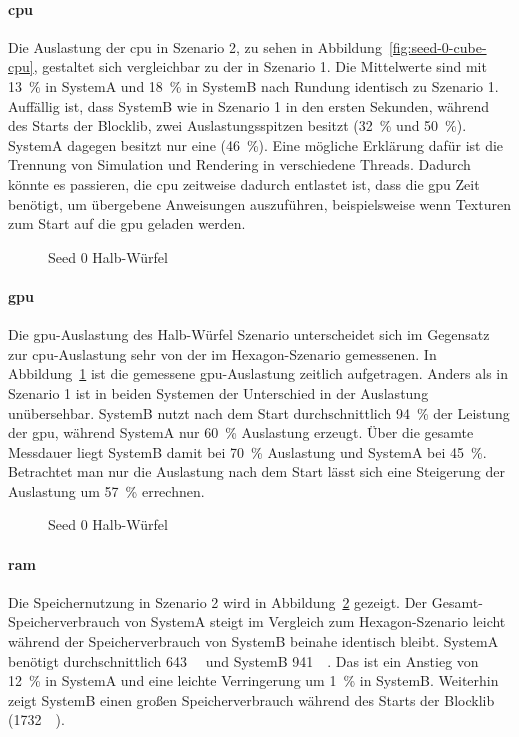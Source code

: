 \paragraph{\ac{cpu}} Die Auslastung der \ac{cpu} in Szenario 2, zu sehen in Abbildung~\ref{fig:seed-0-cube-cpu}, gestaltet sich vergleichbar zu der in Szenario 1. Die Mittelwerte sind mit \SI{13}{\percent} in SystemA und \SI{18}{\percent} in SystemB nach Rundung identisch zu Szenario 1.
Auffällig ist, dass SystemB wie in Szenario 1 in den ersten Sekunden, während des Starts der Blocklib, zwei Auslastungsspitzen besitzt (\SI{32}{\percent} und \SI{50}{\percent}). SystemA dagegen besitzt nur eine (\SI{46}{\percent}). Eine mögliche Erklärung dafür ist die Trennung von Simulation und Rendering in verschiedene Threads. Dadurch könnte es passieren, die \ac{cpu} zeitweise dadurch entlastet ist, dass die \ac{gpu} Zeit benötigt, um übergebene Anweisungen auszuführen, beispielsweise wenn Texturen zum Start auf die \ac{gpu} geladen werden.

\begin{figure}[!htb]
	\caption{Seed 0 Halb-Würfel}\label{fig:seed-0-cube-gpu}
\end{figure}
\paragraph{\ac{gpu}} Die \ac{gpu}-Auslastung des Halb-Würfel Szenario unterscheidet sich im Gegensatz zur \ac{cpu}-Auslastung sehr von der im Hexagon-Szenario gemessenen. In Abbildung~\ref{fig:seed-0-cube-gpu} ist die gemessene \ac{gpu}-Auslastung zeitlich aufgetragen. Anders als in Szenario 1 ist in beiden Systemen der Unterschied in der Auslastung unübersehbar. SystemB nutzt nach dem Start durchschnittlich \SI{94}{\percent} der Leistung der \ac{gpu}, während SystemA nur \SI{60}{\percent} Auslastung erzeugt. Über die gesamte Messdauer liegt SystemB damit bei \SI{70}{\percent} Auslastung und SystemA bei \SI{45}{\percent}. Betrachtet man nur die Auslastung nach dem Start lässt sich eine Steigerung der Auslastung um \SI{57}{\percent} errechnen.

\begin{figure}[!htb]
	\caption{Seed 0 Halb-Würfel}\label{fig:seed-0-cube-mem}
\end{figure} 
\paragraph{\ac{ram}} Die Speichernutzung in Szenario 2 wird in Abbildung~\ref{fig:seed-0-cube-mem} gezeigt. Der Ge\-samt-Spei\-cher\-ver\-brauch von SystemA steigt im Vergleich zum Hexagon-Szenario leicht während der Speicherverbrauch von SystemB beinahe identisch bleibt. SystemA benötigt durchschnittlich \SI{643}{\mega\byte} und SystemB \SI{941}{\mega\byte}. Das ist ein Anstieg von \SI{12}{\percent} in SystemA und eine leichte Verringerung um \SI{1}{\percent} in SystemB. Weiterhin zeigt SystemB einen großen Speicherverbrauch während des Starts der Blocklib (\SI{1732}{\mega\byte}).

